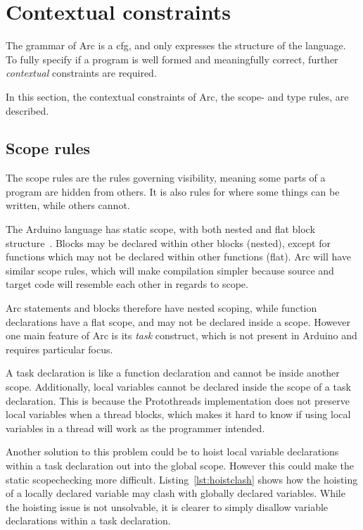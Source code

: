 \section{Contextual constraints}
The grammar of Arc is a \gls{cfg}, and only expresses the structure of the language. To fully specify if a program is well formed and meaningfully correct, further \textit{contextual} constraints are required.

In this section, the contextual constraints of Arc, the scope- and type rules, are described.

\subsection{Scope rules}\label{subsec:scoperules}
The scope rules are the rules governing visibility, meaning some parts of a program are hidden from others. It is also rules for where some things can be written, while others cannot.

The Arduino language has static scope, with both nested and flat block structure~\cite{cppref}. Blocks may be declared within other blocks (nested), except for functions which may not be declared within other functions (flat). Arc will have similar scope rules, which will make compilation simpler because source and target code will resemble each other in regards to scope.

Arc statements and blocks therefore have nested scoping, while function declarations have a flat scope, and may not be declared inside a scope. However one main feature of Arc is its \textit{task} construct, which is not present in Arduino and requires particular focus.

A task declaration is like a function declaration and cannot be inside another scope. Additionally, local variables cannot be declared inside the scope of a task declaration. This is because the Protothreads implementation does not preserve local variables when a thread blocks, which makes it hard to know if using local variables in a thread will work as the programmer intended.

Another solution to this problem could be to hoist local variable declarations within a task declaration out into the global scope. However this could make the static scopechecking more difficult. Listing~\ref{lst:hoistclash} shows how the hoisting of a locally declared variable may clash with globally declared variables. While the hoisting issue is not unsolvable, it is clearer to simply disallow variable declarations within a task declaration.


